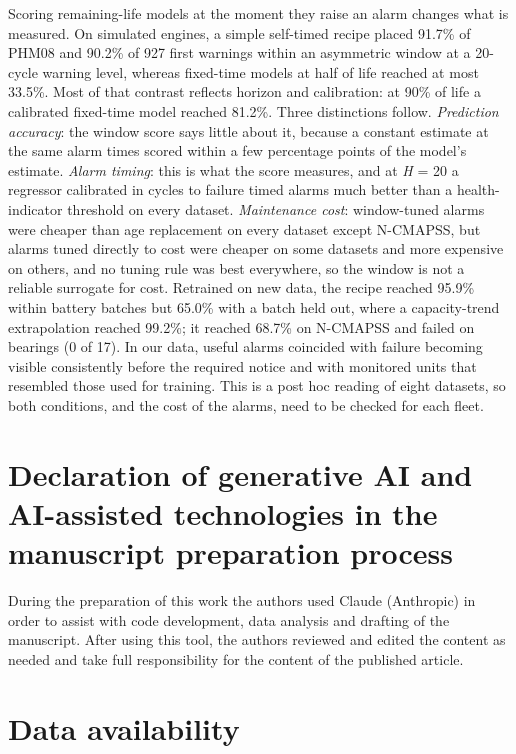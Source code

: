 \documentclass[a4paper,fleqn,doubleblind]{cas-dc}
\begin{document}
Scoring remaining-life models at the moment they raise an alarm changes what is measured. On simulated engines, a simple self-timed recipe placed 91.7\% of PHM08 and 90.2\% of 927 first warnings within an asymmetric window at a 20-cycle warning level, whereas fixed-time models at half of life reached at most 33.5\%. Most of that contrast reflects horizon and calibration: at 90\% of life a calibrated fixed-time model reached 81.2\%. Three distinctions follow. \textit{Prediction accuracy}: the window score says little about it, because a constant estimate at the same alarm times scored within a few percentage points of the model's estimate. \textit{Alarm timing}: this is what the score measures, and at \textit{H} = 20 a regressor calibrated in cycles to failure timed alarms much better than a health-indicator threshold on every dataset. \textit{Maintenance cost}: window-tuned alarms were cheaper than age replacement on every dataset except N-CMAPSS, but alarms tuned directly to cost were cheaper on some datasets and more expensive on others, and no tuning rule was best everywhere, so the window is not a reliable surrogate for cost. Retrained on new data, the recipe reached 95.9\% within battery batches but 65.0\% with a batch held out, where a capacity-trend extrapolation reached 99.2\%; it reached 68.7\% on N-CMAPSS and failed on bearings (0 of 17). In our data, useful alarms coincided with failure becoming visible consistently before the required notice and with monitored units that resembled those used for training. This is a post hoc reading of eight datasets, so both conditions, and the cost of the alarms, need to be checked for each fleet.

\section*{Declaration of generative AI and AI-assisted technologies in the manuscript preparation process}

\noindent During the preparation of this work the authors used Claude (Anthropic) in order to assist with code development, data analysis and drafting of the manuscript. After using this tool, the authors reviewed and edited the content as needed and take full responsibility for the content of the published article.

\section*{Data availability}
\end{document}
